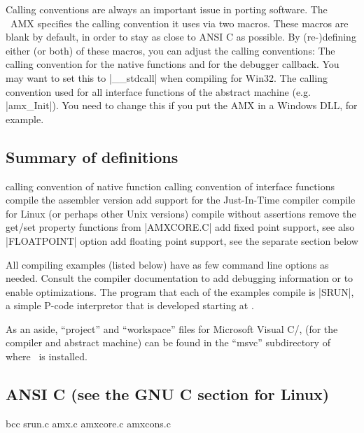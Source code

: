 Calling conventions are always an important issue in porting software. The
\Small\ AMX specifies the calling convention it uses via two macros. These
macros are blank by default, in order to stay as close to ANSI C as possible.
By (re-)defining either (or both) of these macros, you can adjust the calling
conventions:
\beginlist{100pt} \compactlist
{}
    The calling convention for the native functions and for the debugger
    callback. You may want to set this to |__stdcall| when compiling for Win32.
    The calling convention used for all interface functions of the abstract
    machine (e.g. |amx_Init|). You need to change this if you put the AMX in a
    Windows DLL, for example.
\endlist

\subsection{Summary of definitions}
\beginlist{100pt} \compactlist
{}
    calling convention of native function
    calling convention of interface functions
    compile the assembler version
    add support for the Just-In-Time compiler
    compile for Linux (or perhaps other Unix versions)
    compile without assertions
    remove the get/set property functions from |AMXCORE.C|
    add fixed point support, see also |FLOATPOINT| option
    add floating point support, see the separate section below
\endlist

All compiling examples (listed below) have as few command line options as
needed. Consult the compiler documentation to add debugging information or to
enable optimizations. The program that each of the examples compile is |SRUN|,
a simple P-code interpretor that is developed starting at .

As an aside, ``project'' and ``workspace'' files for Microsoft Visual C/\Cpp,
(for the compiler and abstract machine) can be found in the ``msvc'' subdirectory
of where \Small\ is installed.

\subsection{ANSI C (see the GNU C section for Linux)}
\beginlist{40pt}
 \lbreak
        {\smalltt bcc srun.c amx.c amxcore.c amxcons.c}

